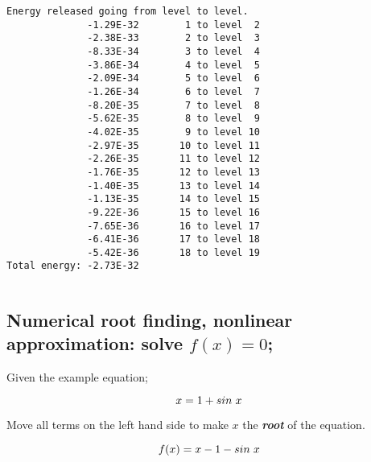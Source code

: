\documentclass[11pt]{article}
\newcommand{\prompt}[4]{
        \llap{{\color{#2}[#3]: #4}}\vspace{-1.25em}
    }
\begin{document}
    \begin{Verbatim}[commandchars=\\\{\}]
Energy released going from level to level.
              -1.29E-32        1 to level  2
              -2.38E-33        2 to level  3
              -8.33E-34        3 to level  4
              -3.86E-34        4 to level  5
              -2.09E-34        5 to level  6
              -1.26E-34        6 to level  7
              -8.20E-35        7 to level  8
              -5.62E-35        8 to level  9
              -4.02E-35        9 to level 10
              -2.97E-35       10 to level 11
              -2.26E-35       11 to level 12
              -1.76E-35       12 to level 13
              -1.40E-35       13 to level 14
              -1.13E-35       14 to level 15
              -9.22E-36       15 to level 16
              -7.65E-36       16 to level 17
              -6.41E-36       17 to level 18
              -5.42E-36       18 to level 19
Total energy: -2.73E-32
\end{Verbatim}

    \begin{tcolorbox}[breakable, size=fbox, boxrule=1pt, pad at break*=1mm,colback=cellbackground, colframe=cellborder]
\prompt{In}{incolor}{ }{\hspace{4pt}}
\begin{Verbatim}[commandchars=\\\{\}]

\end{Verbatim}
\end{tcolorbox}

    \subsection{\texorpdfstring{Numerical root finding, nonlinear
approximation: solve
\(f(x) = 0\);}{Numerical root finding, nonlinear approximation: solve f(x) = 0;}}\label{numerical-root-finding-nonlinear-approximation-solve-fx-0}

Given the example equation;

\[x = 1 + sin \hspace{3 px} x \\ \]

Move all terms on the left hand side to make \(x\) the
\textbf{\emph{root}} of the equation.

\[ f(x) = x - 1 - sin \hspace {3 px} x \\ \\ \]
\end{document}
